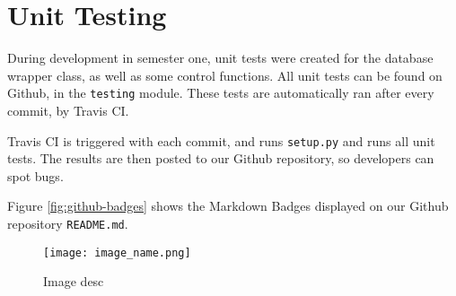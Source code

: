 \section{Unit Testing}
\label{sec:unit-testing}
\pagestyle{cameron}

During development in semester one, unit tests were created for the database wrapper class, as well as some control functions. All unit tests can be found on Github, in the \texttt{testing} module. These tests are automatically ran after every commit, by Travis \gls{CI}.

Travis \gls{CI} is triggered with each commit, and runs \texttt{setup.py} and runs all unit tests. The results are then posted to our Github repository, so developers can spot bugs.

Figure \ref{fig:github-badges} shows the Markdown Badges displayed on our Github repository \texttt{README.md}.


\begin{figure}[!htb]
\begin{center}
\texttt{[image: image\_name.png]}
\end{center}
\caption{Image desc}
\label{fig:image}
\end{figure}
